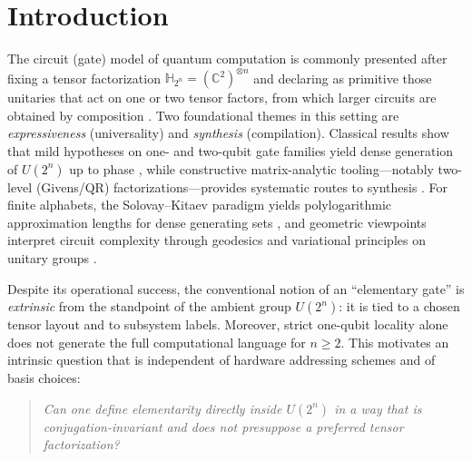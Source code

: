 \documentclass{article}%
\theoremstyle{definition}
\numberwithin{equation}{section}
\newcommand{\C}{\mathbb{C}}
\begin{document}
\section{Introduction}
\label{sec:introduction}

The circuit (gate) model of quantum computation is commonly presented after fixing a tensor
factorization $\mathbb{H}_{2^n}=(\C^2)^{\otimes n}$ and declaring as primitive those unitaries that
act on one or two tensor factors, from which larger circuits are obtained by composition
\cite{NielsenChuang2010}. Two foundational themes in this setting are \emph{expressiveness}
(universality) and \emph{synthesis} (compilation). Classical results show that mild hypotheses on
one- and two-qubit gate families yield dense generation of $U(2^n)$ up to phase
\cite{BarencoEtAl1995,DiVincenzo1995,DeutschBarencoEkert1995}, while constructive matrix-analytic
tooling---notably two-level (Givens/QR) factorizations---provides systematic routes to synthesis
\cite{ReckZeilingerBernsteinBertani1994}. For finite alphabets, the Solovay--Kitaev paradigm yields
polylogarithmic approximation lengths for dense generating sets
\cite{Kitaev2002,DawsonNielsen2006,HarrowRechtChuang2002}, and geometric viewpoints interpret circuit
complexity through geodesics and variational principles on unitary groups
\cite{NielsenDowlingGuDoherty2006,DowlingNielsen2008}.

Despite its operational success, the conventional notion of an ``elementary gate'' is \emph{extrinsic}
from the standpoint of the ambient group $U(2^n)$: it is tied to a chosen tensor layout and to
subsystem labels. Moreover, strict one-qubit locality alone does not generate the full computational
language for $n\ge 2$. This motivates an intrinsic question that is independent of hardware
addressing schemes and of basis choices:

\begin{quote}
\emph{Can one define elementarity directly inside $U(2^n)$ in a way that is conjugation-invariant and
does not presuppose a preferred tensor factorization?}
\end{quote}
\end{document}
